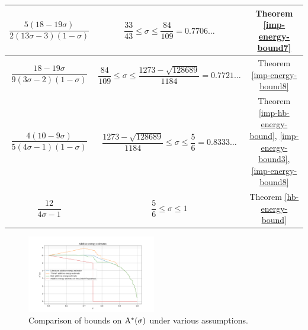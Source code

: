 \begin{table}[ht]
\begin{tabular}{|c|c|c|}
    \hline
    $\dfrac{5(18 - 19\sigma)}{2(13\sigma - 3)(1 - \sigma)}$ & $\dfrac{33}{43} \leq \sigma \le \dfrac{84}{109} = 0.7706\ldots$ & Theorem \ref{imp-energy-bound7}\\
    \hline
    $\dfrac{18 - 19\sigma}{9(3\sigma - 2)(1 - \sigma)}$ & $\dfrac{84}{109} \leq \sigma \le \dfrac{1273 - \sqrt{128689}}{1184} = 0.7721\ldots$ & Theorem \ref{imp-energy-bound8}\\
    \hline
    $\dfrac{4(10 - 9\sigma)}{5(4\sigma - 1)(1 - \sigma)}$ & $\dfrac{1273 - \sqrt{128689}}{1184} \leq \sigma \le \dfrac{5}{6} = 0.8333\ldots$ & Theorem \ref{imp-hb-energy-bound}, \ref{imp-energy-bound3}, \ref{imp-energy-bound8}\\
    \hline
    $\dfrac{12}{4\sigma - 1}$ & $\dfrac{5}{6} \leq \sigma \le 1$ & Theorem \ref{hb-energy-bound}\\
    \hline
    \end{tabular}
    \label{zero-density-energy-estimates-table}
\end{table}

\begin{figure}
    \centering
    \includegraphics[width=0.5\textwidth]{chapter/zero_density_energy_estimate.png}
    \caption{Comparison of bounds on $\mathrm{A}^*(\sigma)$ under various assumptions.}
    \label{fig:zero_density_energy_estimate}
\end{figure}
